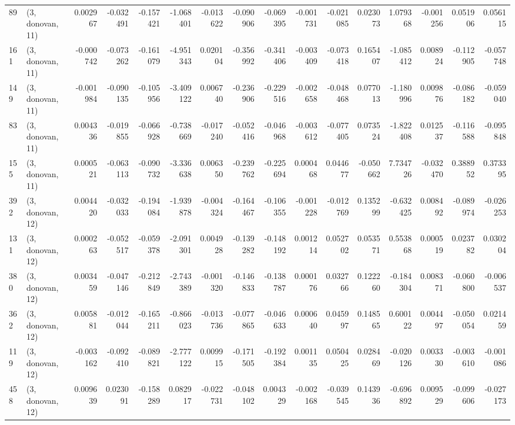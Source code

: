 \begin{tabular}{llrrrrrrrrrrrrrr}
89  &  (3, donovan, 11) &   0.002967 & -0.032491 & -0.157421 &    -1.068401 &  -0.013622 &  -0.090906 &  -0.069395 & -0.001731 & -0.021085 &  0.023073 &    1.079368 & -0.001256 &  0.051906 &  0.056115 \\
161 &  (3, donovan, 11) &  -0.000742 & -0.073262 & -0.161079 &    -4.951343 &   0.020104 &  -0.356992 &  -0.341406 & -0.003409 & -0.073418 &  0.165407 &   -1.085412 &  0.008924 & -0.112905 & -0.057748 \\
149 &  (3, donovan, 11) &  -0.001984 & -0.090135 & -0.105956 &    -3.409122 &   0.006740 &  -0.236906 &  -0.229516 & -0.002658 & -0.048468 &  0.077013 &   -1.180996 &  0.009876 & -0.086182 & -0.059040 \\
83  &  (3, donovan, 11) &   0.004336 & -0.019855 & -0.066928 &    -0.738669 &  -0.017240 &  -0.052416 &  -0.046968 & -0.003612 & -0.077405 &  0.073524 &   -1.822408 &  0.012537 & -0.116588 & -0.095848 \\
155 &  (3, donovan, 11) &   0.000521 & -0.063113 & -0.090732 &    -3.336638 &   0.006350 &  -0.239762 &  -0.225694 &  0.000468 &  0.044677 & -0.050662 &    7.734726 & -0.032470 &  0.388952 &  0.373395 \\
392 &  (3, donovan, 12) &   0.004420 & -0.032033 & -0.194084 &    -1.939878 &  -0.004324 &  -0.164467 &  -0.106355 & -0.001228 & -0.012769 &  0.135299 &   -0.632425 &  0.008492 & -0.089974 & -0.026253 \\
131 &  (3, donovan, 12) &   0.000263 & -0.052517 & -0.059378 &    -2.091301 &   0.004928 &  -0.139282 &  -0.148192 &  0.001214 &  0.052702 &  0.053571 &    0.553868 &  0.000519 &  0.023782 &  0.030204 \\
380 &  (3, donovan, 12) &   0.003459 & -0.047146 & -0.212849 &    -2.743389 &  -0.001320 &  -0.146833 &  -0.138787 &  0.000176 &  0.032766 &  0.122260 &   -0.184304 &  0.008371 & -0.060800 & -0.006537 \\
362 &  (3, donovan, 12) &   0.005881 & -0.012044 & -0.165211 &    -0.866023 &  -0.013736 &  -0.077865 &  -0.046633 &  0.000640 &  0.045997 &  0.148565 &    0.600122 &  0.004497 & -0.050054 &  0.021459 \\
119 &  (3, donovan, 12) &  -0.003162 & -0.092410 & -0.089821 &    -2.777122 &   0.009915 &  -0.171505 &  -0.192384 &  0.001135 &  0.050425 &  0.028469 &   -0.020126 &  0.003330 & -0.003610 & -0.001086 \\
458 &  (3, donovan, 12) &   0.009639 &  0.023091 & -0.158289 &     0.082917 &  -0.022731 &  -0.048102 &   0.004329 & -0.002168 & -0.039545 &  0.143936 &   -0.696892 &  0.009529 & -0.099606 & -0.027173 \\

\end{tabular}
